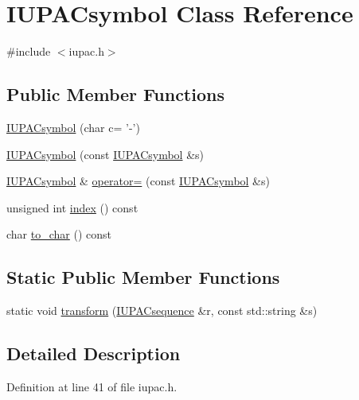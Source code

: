 \hypertarget{class_i_u_p_a_csymbol}{\section{I\+U\+P\+A\+Csymbol Class Reference}
\label{class_i_u_p_a_csymbol}
}


{\ttfamily \#include $<$iupac.\+h$>$}

\subsection*{Public Member Functions}
\begin{DoxyCompactItemize}
\item 
\hyperlink{class_i_u_p_a_csymbol_a6e81e2f20f4a41af5a3bef0be99b7a21}{I\+U\+P\+A\+Csymbol} (char c= '-\/')
\item 
\hyperlink{class_i_u_p_a_csymbol_a84bbe260e0baf5795575661898f771a5}{I\+U\+P\+A\+Csymbol} (const \hyperlink{class_i_u_p_a_csymbol}{I\+U\+P\+A\+Csymbol} \&s)
\item 
\hyperlink{class_i_u_p_a_csymbol}{I\+U\+P\+A\+Csymbol} \& \hyperlink{class_i_u_p_a_csymbol_a5ac6218eeee6a281bafcc3d4021b2bd8}{operator=} (const \hyperlink{class_i_u_p_a_csymbol}{I\+U\+P\+A\+Csymbol} \&s)
\item 
unsigned int \hyperlink{class_i_u_p_a_csymbol_ae180bb7af881834ef960724ebbb815a0}{index} () const 
\item 
char \hyperlink{class_i_u_p_a_csymbol_ae940f3942ea09fc254beb22327ac9804}{to\+\_\+char} () const 
\end{DoxyCompactItemize}
\subsection*{Static Public Member Functions}
\begin{DoxyCompactItemize}
\item 
static void \hyperlink{class_i_u_p_a_csymbol_a51951cb7bac3f7ca28171bd4ac76a5b9}{transform} (\hyperlink{iupac_8h_a364ef750df8d90674fae75b030363cc2}{I\+U\+P\+A\+Csequence} \&r, const std\+::string \&s)
\end{DoxyCompactItemize}


\subsection{Detailed Description}


Definition at line 41 of file iupac.\+h.



